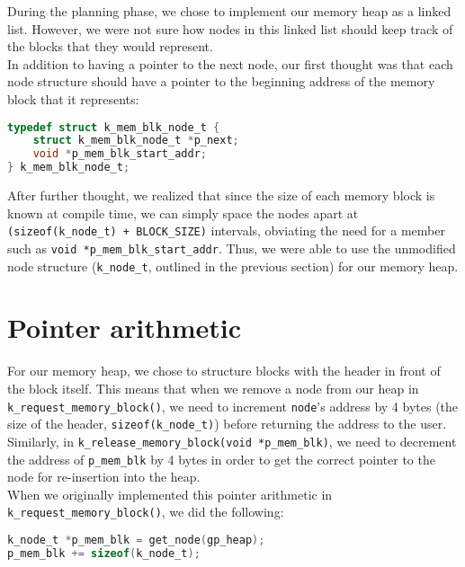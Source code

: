 \documentclass[12pt]{report}
\begin{document}
During the planning phase, we chose to implement our memory heap as a linked list. However, we were not sure how nodes in this linked list should keep track of the blocks that they would represent.\\

In addition to having a pointer to the next node, our first thought was that each node structure should have a pointer to the beginning address of the memory block that it represents:

\begin{minipage}{\textwidth}
\begin{lstlisting}[language=C]
typedef struct k_mem_blk_node_t {
    struct k_mem_blk_node_t *p_next;
    void *p_mem_blk_start_addr;
} k_mem_blk_node_t;
\end{lstlisting}
\end{minipage}

After further thought, we realized that since the size of each memory block is known at compile time, we can simply space the nodes apart at \texttt{(sizeof(k_node_t) + BLOCK_SIZE)} intervals, obviating the need for a member such as \texttt{void *p_mem_blk_start_addr}. Thus, we were able to use the unmodified node structure (\texttt{k_node_t}, outlined in the previous section) for our memory heap.

\section{Pointer arithmetic}

For our memory heap, we chose to structure blocks with the header in front of the block itself. This means that when we remove a node from our heap in \texttt{k_request_memory_block()}, we need to increment \texttt{node}'s address by 4 bytes (the size of the header, \texttt{sizeof(k_node_t)}) before returning the address to the user. Similarly, in \texttt{k_release_memory_block(void *p_mem_blk)}, we need to decrement the address of \texttt{p_mem_blk} by 4 bytes in order to get the correct pointer to the node for re-insertion into the heap.\\

When we originally implemented this pointer arithmetic in \texttt{k_request_memory_block()}, we did the following:

\begin{minipage}{\textwidth}
\begin{lstlisting}[language=C]
k_node_t *p_mem_blk = get_node(gp_heap);
p_mem_blk += sizeof(k_node_t);
\end{lstlisting}
\end{minipage}
\end{document}

